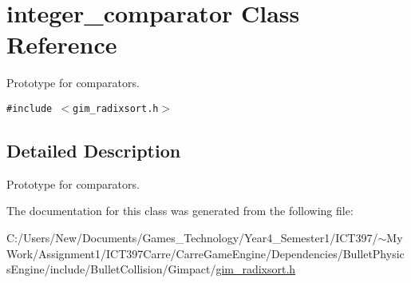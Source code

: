\hypertarget{classinteger__comparator}{
\section{integer\_\-comparator Class Reference}
\label{classinteger__comparator}
}
Prototype for comparators.  


{\tt \#include $<$gim\_\-radixsort.h$>$}



\subsection{Detailed Description}
Prototype for comparators. 

The documentation for this class was generated from the following file:\begin{CompactItemize}
\item 
C:/Users/New/Documents/Games\_\-Technology/Year4\_\-Semester1/ICT397/$\sim$My Work/Assignment1/ICT397Carre/CarreGameEngine/Dependencies/BulletPhysicsEngine/include/BulletCollision/Gimpact/\hyperlink{gim__radixsort_8h}{gim\_\-radixsort.h}\end{CompactItemize}
